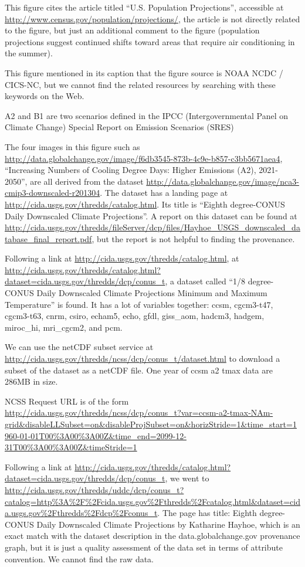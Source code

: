 This figure cites the article titled ``U.S. Population Projections'', accessible at \url{http://www.census.gov/population/projections/}, the article is not directly related to the figure, but just an additional comment to the figure (population projections suggest continued shifts toward areas that require air conditioning in the summer).

This figure mentioned in its caption that the figure source is NOAA NCDC / CICS-NC, but we cannot find the related resources by searching with these keywords on the Web.

A2 and B1 are two scenarios defined in the IPCC (Intergovernmental Panel on Climate Change) Special Report on Emission Scenarios (SRES)

The four images in this figure such as \url{http://data.globalchange.gov/image/f6db3545-873b-4c9e-b857-c3bb5671aea4}, ``Increasing Numbers of Cooling Degree Days: Higher Emissions (A2), 2021-2050'', are all derived from the dataset \url{http://data.globalchange.gov/image/nca3-cmip3-downscaled-r201304}. The dataset has a landing page at \url{http://cida.usgs.gov/thredds/catalog.html}. Its title is ``Eighth degree-CONUS Daily Downscaled Climate Projections''. A report on this dataset can be found at \url{http://cida.usgs.gov/thredds/fileServer/dcp/files/Hayhoe_USGS_downscaled_database_final_report.pdf}, but the report is not helpful to finding the provenance.

Following a link at \url{http://cida.usgs.gov/thredds/catalog.html}, at \url{http://cida.usgs.gov/thredds/catalog.html?dataset=cida.usgs.gov/thredds/dcp/conus_t}, a dataset called ``1/8 degree-CONUS Daily Downscaled Climate Projections Minimum and Maximum Temperature'' is found. It has a lot of variables together: ccsm, cgcm3-t47, cgcm3-t63, cnrm, csiro, echam5, echo, gfdl, giss\_aom, hadcm3, hadgem, miroc\_hi, mri\_cgcm2, and pcm. 

We can use the netCDF subset service at \url{http://cida.usgs.gov/thredds/ncss/dcp/conus_t/dataset.html} to download a subset of the dataset as a netCDF file. One year of ccsm a2 tmax data are 286MB in size.

NCSS Request URL is of the form \url{http://cida.usgs.gov/thredds/ncss/dcp/conus_t?var=ccsm-a2-tmax-NAm-grid&disableLLSubset=on&disableProjSubset=on&horizStride=1&time_start=1960-01-01T00%3A00%3A00Z&time_end=2099-12-31T00%3A00%3A00Z&timeStride=1}

Following a link at \url{http://cida.usgs.gov/thredds/catalog.html?dataset=cida.usgs.gov/thredds/dcp/conus_t}, we went to \url{http://cida.usgs.gov/thredds/uddc/dcp/conus_t?catalog=http%3A%2F%2Fcida.usgs.gov%2Fthredds%2Fcatalog.html&dataset=cida.usgs.gov%2Fthredds%2Fdcp%2Fconus_t}. 
	The page has title: Eighth degree-CONUS Daily Downscaled Climate Projections by Katharine Hayhoe, which is an exact match with the dataset description in the data.globalchange.gov provenance graph, but it is just a quality assessment of the data set in terms of attribute convention. We cannot find the raw data.

